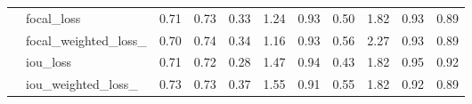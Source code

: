 \begin{tabular}{llrrrrrrrrr}
      & focal\_loss &      0.71 &        0.73 &     0.33 &      1.24 &    0.93 &        0.50 &         1.82 &       0.93 &         0.89 \\
      & focal\_weighted\_loss\_ &      0.70 &        0.74 &     0.34 &      1.16 &    0.93 &        0.56 &         2.27 &       0.93 &         0.89 \\
      & iou\_loss &      0.71 &        0.72 &     0.28 &      1.47 &    0.94 &        0.43 &         1.82 &       0.95 &         0.92 \\
      & iou\_weighted\_loss\_ &      0.73 &        0.73 &     0.37 &      1.55 &    0.91 &        0.55 &         1.82 &       0.92 &         0.89 \\
\bottomrule
\end{tabular}
